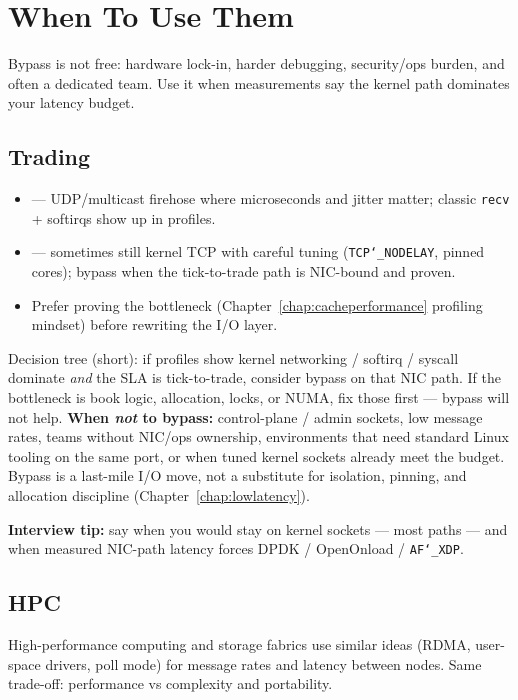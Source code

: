 \section{When To Use Them}
\label{sec:kernel-bypass-when-to-use}
Bypass is not free: hardware lock-in, harder debugging, security/ops burden, and often a 
dedicated team. Use it when measurements say the kernel path dominates your latency budget.

\subsection{Trading}
\label{subsec:kernel-bypass-trading}
\begin{itemize}
    \item {} --- UDP/multicast firehose where microseconds and jitter 
          matter; classic \texttt{recv} + softirqs show up in profiles.
    \item {} --- sometimes still kernel TCP with careful tuning 
          (\texttt{TCP\char`_NODELAY}, pinned cores); bypass when the tick-to-trade path is 
          NIC-bound and proven.
    \item Prefer proving the bottleneck (Chapter~\ref{chap:cacheperformance} profiling mindset) 
          before rewriting the I/O layer.
\end{itemize}
Decision tree (short): if profiles show kernel networking / softirq / syscall dominate 
\emph{and} the SLA is tick-to-trade, consider bypass on that NIC path. If the bottleneck is 
book logic, allocation, locks, or NUMA, fix those first --- bypass will not help.
\newline
\textbf{When \emph{not} to bypass:} control-plane / admin sockets, low message rates, teams 
without NIC/ops ownership, environments that need standard Linux tooling on the same port, 
or when tuned kernel sockets already meet the budget. Bypass is a last-mile I/O move, not a 
substitute for isolation, pinning, and allocation discipline (Chapter~\ref{chap:lowlatency}).
\par\noindent\textbf{Interview tip:} say when you would stay on kernel sockets --- most paths --- 
and when measured NIC-path latency forces DPDK / OpenOnload / \texttt{AF\char`_XDP}.

\subsection{HPC}
\label{subsec:kernel-bypass-hpc}
High-performance computing and storage fabrics use similar ideas (RDMA, user-space drivers, 
poll mode) for message rates and latency between nodes. Same trade-off: performance vs 
complexity and portability.

